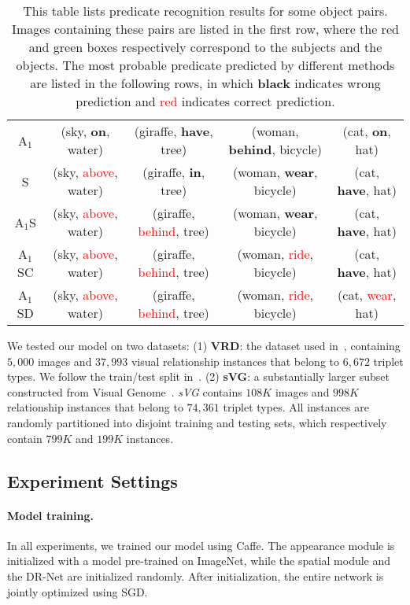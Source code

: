 \documentclass[10pt,twocolumn,letterpaper]{article}
\begin{document}
\begin{table*}
\begin{tabular}{c|c|c|c|c}
        \\
        A$_1$ & (sky, \textbf{on}, water)
        & (giraffe, \textbf{have}, tree) 
        & (woman, \textbf{behind}, bicycle)
        & (cat, \textbf{on}, hat)
        \\
        S & (sky, \textcolor{red}{above}, water)
        & (giraffe, \textbf{in}, tree) 
        & (woman, \textbf{wear}, bicycle)
        & (cat, \textbf{have}, hat)
        \\
        A$_1$S & (sky, \textcolor{red}{above}, water)
        & (giraffe, \textcolor{red}{behind}, tree)
        & (woman, \textbf{wear}, bicycle)
        & (cat, \textbf{have}, hat)
        \\
        A$_1$SC & (sky, \textcolor{red}{above}, water)
        & (giraffe, \textcolor{red}{behind}, tree)
        & (woman, \textcolor{red}{ride}, bicycle)
        & (cat, \textbf{have}, hat)
        \\
        A$_1$SD & (sky, \textcolor{red}{above}, water)
        & (giraffe, \textcolor{red}{behind}, tree)
        & (woman, \textcolor{red}{ride}, bicycle)
        & (cat, \textcolor{red}{wear}, hat)
    \end{tabular}
    \caption{\small This table lists predicate recognition results for some object pairs. 
    Images containing these pairs are listed in the first row,
    where the red and green boxes respectively correspond to the subjects and the objects.
    The most probable predicate predicted by different methods are listed in the following rows,
    in which \textbf{black} indicates wrong prediction and \textcolor{red}{red} indicates correct prediction.}
    \label{tab:itr_sample}
\end{table*}

We tested our model on two datasets:
(1) \textbf{VRD}: the dataset used in~\cite{lu2016visual},
containing $5,000$ images and
$37,993$ visual relationship instances that belong to
$6,672$ triplet types.
We follow the train/test split in~\cite{lu2016visual}.
%
(2) \textbf{sVG}: a substantially larger subset
constructed from Visual Genome~\cite{krishnavisualgenome}.
\emph{sVG} contains $108K$ images and $998K$ relationship instances
that belong to $74,361$ triplet types.
All instances are randomly partitioned into disjoint training and testing sets,
which respectively contain $799K$ and $199K$ instances.

\subsection{Experiment Settings}\paragraph{Model training.}%
In all experiments, we trained our model using Caffe\cite{jia2014caffe}.
The appearance module is initialized with a model pre-trained on ImageNet,
while the spatial module and the DR-Net are initialized randomly.
After initialization, the entire network is jointly optimized using SGD.
\end{document}
